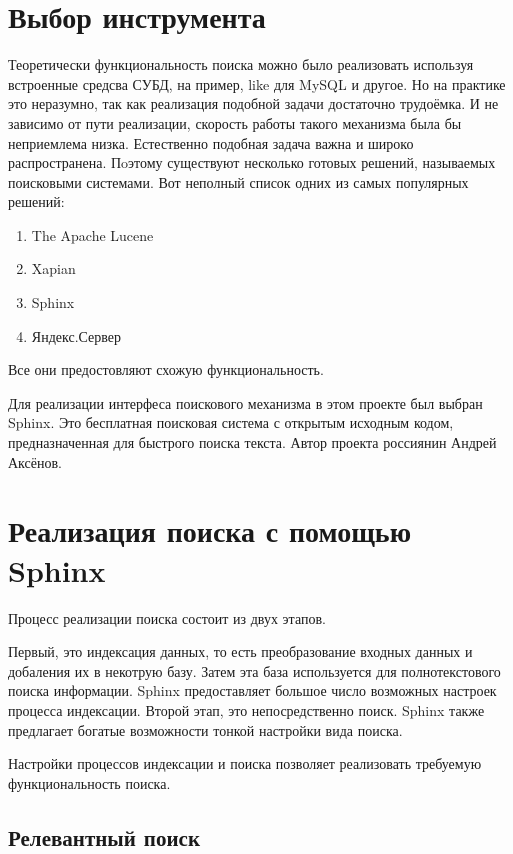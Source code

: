 
\section{Выбор инструмента}


Теоретически функциональность поиска можно было реализовать используя
встроенные средсва СУБД, на пример, like для MySQL и другое.
Но на практике это неразумно, так как реализация подобной задачи 
достаточно трудоёмка.
И не зависимо от пути реализации, скорость работы такого механизма была бы неприемлема низка.
Естественно подобная задача важна и широко распространена.
Пoэтому существуют несколько готовых решений, называемых поисковыми системами.
Вот неполный список одних из самых популярных решений:
\begin{enumerate}
    \item The Apache Lucene 
    \item Xapian
    \item Sphinx
    \item Яндекс.Сервер
\end{enumerate}

Все они предостовляют схожую функциональность.

Для реализации интерфеса поискового механизма в этом проекте был выбран Sphinx. 
Это бесплатная поисковая система с открытым исходным кодом, 
предназначенная для быстрого поиска текста. 
Автор проекта россиянин Андрей Аксёнов.

\section{Реализация поиска с помощью Sphinx}

Процесс реализации поиска состоит из двух этапов.

Первый, это индексация данных, то есть преобразование входных данных и добаления их в некотрую базу.
Затем эта база используется для полнотекстового поиска информации.
Sphinx предоставляет большое число возможных настроек процесса индексации.
Второй этап, это непосредственно поиск. Sphinx также предлагает богатые возможности тонкой настройки вида поиска.

Настройки процессов индексации и поиска позволяет реализовать требуемую функциональность поиска.

\subsection{Релевантный поиск}

